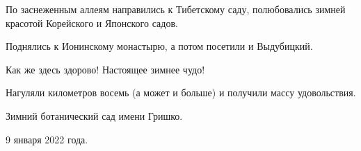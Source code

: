 По заснеженным аллеям  направились к Тибетскому саду, полюбовались зимней
красотой Корейского и Японского садов.

Поднялись к Ионинскому монастырю, а потом посетили и Выдубицкий.

Как же здесь здорово! Настоящее зимнее чудо!

Нагуляли километров восемь (а может и больше)  и получили массу удовольствия.

Зимний ботанический сад имени Гришко.

9 января 2022 года.

